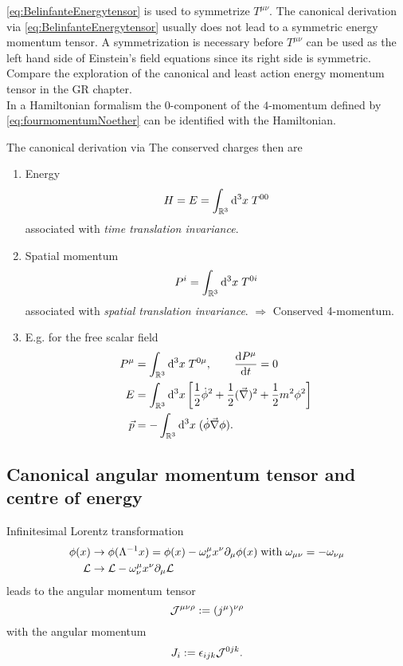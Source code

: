 \ref{eq:BelinfanteEnergytensor} is used to symmetrize $T^{\mu\nu}$. The canonical derivation via \ref{eq:BelinfanteEnergytensor} usually does not lead to a symmetric energy momentum tensor. A symmetrization is necessary before $T^{\mu\nu}$ can be used as the left hand side of Einstein's field equations since its right side is symmetric. Compare the exploration of the canonical and least action energy momentum tensor in the GR chapter.\\
In a Hamiltonian formalism the $0$-component of the $4$-momentum defined by \ref{eq:fourmomentumNoether} can be identified with the Hamiltonian.


 The canonical derivation via
The conserved charges then are 
\begin{enumerate}
	\item Energy 
	\begin{equation}
	H=E= \int_{\mathbb{R}^3} \mathrm{d}^3x \; T^{00}
	\end{equation}
	associated with \emph{time translation invariance}.
	\item Spatial momentum 
	\begin{equation}
	P^i = \int_{\mathbb{R}^3} \mathrm{d}^3x \; T^{0i}
	\end{equation}
	associated with \emph{spatial translation invariance}. $\Rightarrow$ Conserved 4-momentum.
	\item E.g. for the free scalar field 
	\begin{align}
	P^{\mu} &= \int_{\mathbb{R}^3} \mathrm{d}^3 x \; T^{0 \mu}, \qquad \frac{\mathrm{d} P^{\mu}}{\mathrm{d} t}=0 \\
	E&= \int_{\mathbb{R}^3} \mathrm{d}^3x \left[\frac{1}{2} \dot{\phi}^2 + \frac{1}{2}(\vec{\nabla})^2 +\frac{1}{2} m^2 \phi^2\right]\\
	\vec{p}&= - \int_{\mathbb{R}^3} \mathrm{d}^3 x \; (\dot{\phi} \vec{\nabla} \phi).
	\end{align}
\end{enumerate}





\subsection{Canonical angular momentum tensor and centre of energy}
Infinitesimal Lorentz transformation
\begin{align}
\phi(x) &\rightarrow \phi(\Lambda^{-1} x) = \phi(x) - \omega^\mu_\nu x^\nu \partial_\mu \phi(x) \; \mathrm{with} \; \omega_{\mu \nu} = - \omega_{\nu\mu}\\
\mathcal{L} &\rightarrow \mathcal{L} - \omega^\mu_\nu x^\nu \partial_\mu \mathcal{L}
\end{align}
leads to the angular momentum tensor
\begin{equation}
	\mathcal{J}^{\mu\nu\rho} := (j^\mu)^{\nu \rho} 
\end{equation}
with the angular momentum
\begin{equation}
	J_i := \epsilon_{ijk} \mathcal{J}^{0jk}.
\end{equation}



